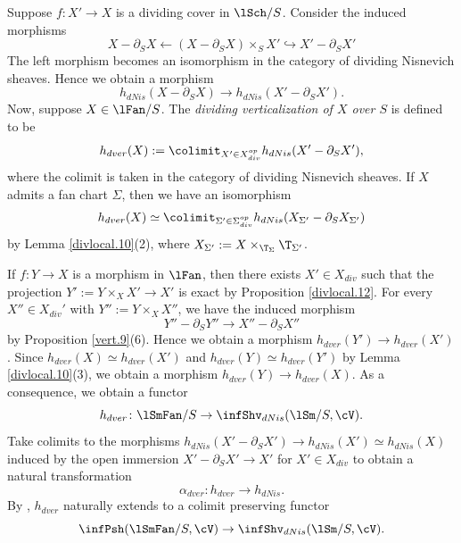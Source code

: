 \documentclass[10pt]{amsart}
\begin{document}
\begin{const}
\label{divlocal.2}
Suppose $f\colon X'\to X$ is a dividing cover in $\lSch/S$.
Consider the induced morphisms
\[
X-\partial_S X
\leftarrow
(X-\partial_S X)\times_S X'
\hookrightarrow
X'-\partial_S X'
\]
The left morphism becomes an isomorphism in the category of dividing Nisnevich sheaves.
Hence we obtain a morphism
\[
h_{dNis}(X-\partial_S X)
\to
h_{dNis}(X'-\partial_S X').
\]
Now, suppose $X\in \lFan/S$.
The \emph{dividing verticalization of $X$ over $S$} is defined to be
\begin{equation}
\label{divlocal.2.8}
h_{dver}(X)
:=
\colimit_{X'\in X_{div}^{op}}
h_{dNis}(X'-\partial_S X'),
\end{equation}
where the colimit is taken in the category of dividing Nisnevich sheaves.
If $X$ admits a fan chart $\Sigma$, then we have an isomorphism
\begin{equation}
h_{dver}(X)
\simeq
\colimit_{\Sigma'\in \Sigma_{div}^{op}}
h_{dNis}(X_{\Sigma'}-\partial_S X_{\Sigma'})
\end{equation}
by Lemma \ref{divlocal.10}(2), where $X_{\Sigma'}:=X\times_{\T_\Sigma}\T_{\Sigma'}$.

If $f\colon Y\to X$ is a morphism in $\lFan$, then there exists $X'\in X_{div}$ such that the projection $Y':=Y\times_X X'\to X'$ is exact by Proposition \ref{divlocal.12}.
For every $X''\in X_{div}'$ with $Y'':=Y\times_X X''$, we have the induced morphism
\[
Y''-\partial_S Y''\to X''-\partial_S X''
\]
by Proposition \ref{vert.9}(6).
Hence we obtain a morphism $h_{dver}(Y')\to h_{dver}(X')$.
Since $h_{dver}(X)\simeq h_{dver}(X')$ and $h_{dver}(Y)\simeq h_{dver}(Y')$ by Lemma \ref{divlocal.10}(3), we obtain a morphism $h_{dver}(Y)\to h_{dver}(X)$.
As a consequence, we obtain a functor
\[
h_{dver}
\colon
\lSmFan/S
\to
\infShv_{dNis}(\lSm/S,\cV).
\]
Take colimits to the morphisms $h_{dNis}(X'-\partial_S X')\to h_{dNis}(X')\simeq h_{dNis}(X)$ induced by the open immersion $X'-\partial_S X'\to X'$ for $X'\in X_{div}$ to obtain a natural transformation
\begin{equation}
\label{divlocal.2.5}
\alpha_{dver}\colon h_{dver}\to h_{dNis}.
\end{equation}
By \cite[Theorem 5.1.5.6]{HTT}, $h_{dver}$ naturally extends to a colimit preserving functor
\begin{equation}
\label{divlocal.2.1}
\infPsh(\lSmFan/S,\cV)
\to
\infShv_{dNis}(\lSm/S,\cV).
\end{equation}
\end{const}
\end{document}
